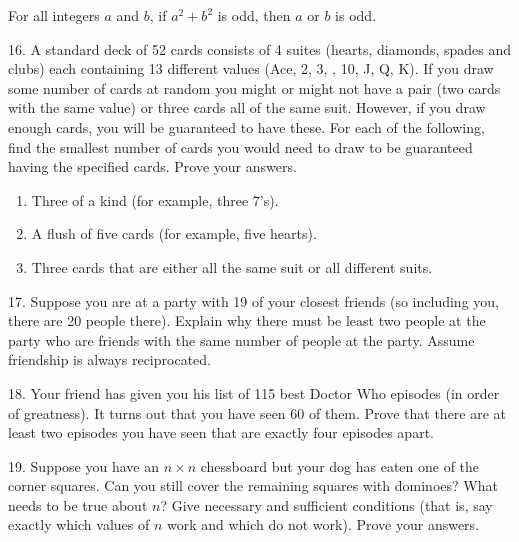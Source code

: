 \documentclass[10pt,]{book}
\theoremstyle{plain}
\theoremstyle{definition}
\theoremstyle{definition}
\theoremstyle{definition}
\theoremstyle{definition}
\numberwithin{equation}{chapter}
\begin{document}
\begin{exerciselist}
\begin{enumerate}[label=(\alph*)]
For all integers \(a\) and \(b\), if \(a^2 + b^2\) is odd, then \(a\) or \(b\) is odd.%
\end{enumerate}
%
\par\smallskip
\item[16.]\hypertarget{exercise-166}{}\hypertarget{p-1450}{}%
A standard deck of 52 cards consists of 4 suites (hearts, diamonds, spades and clubs) each containing 13 different values (Ace, 2, 3, \textellipsis{}, 10, J, Q, K). If you draw some number of cards at random you might or might not have a pair (two cards with the same value) or three cards all of the same suit. However, if you draw enough cards, you will be guaranteed to have these. For each of the following, find the smallest number of cards you would need to draw to be guaranteed having the specified cards. Prove your answers.%
\par
\hypertarget{p-1451}{}%
\leavevmode%
\begin{enumerate}[label=(\alph*)]
\item\hypertarget{li-680}{}\hypertarget{p-1452}{}%
Three of a kind (for example, three 7's). %
\item\hypertarget{li-681}{}\hypertarget{p-1453}{}%
A flush of five cards (for example, five hearts). %
\item\hypertarget{li-682}{}\hypertarget{p-1454}{}%
Three cards that are either all the same suit or all different suits. %
\end{enumerate}
%
\par\smallskip
\item[17.]\hypertarget{exercise-167}{}\hypertarget{p-1455}{}%
Suppose you are at a party with 19 of your closest friends (so including you, there are 20 people there). Explain why there must be least two people at the party who are friends with the same number of people at the party. Assume friendship is always reciprocated.%
\par\smallskip
\item[18.]\hypertarget{exercise-168}{}\hypertarget{p-1456}{}%
Your friend has given you his list of 115 best Doctor Who episodes (in order of greatness).  It turns out that you have seen 60 of them.  Prove that there are at least two episodes you have seen that are exactly four episodes apart.%
\par\smallskip
\item[19.]\hypertarget{exercise-169}{}\hypertarget{p-1457}{}%
Suppose you have an \(n\times n\) chessboard but your dog has eaten one of the corner squares. Can you still cover the remaining squares with dominoes? What needs to be true about \(n\)? Give necessary and sufficient conditions (that is, say exactly which values of \(n\) work and which do not work). Prove your answers.%

\end{exerciselist}
\end{document}
